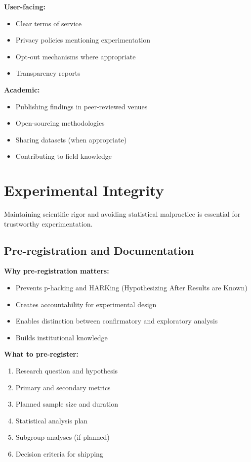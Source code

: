 \textbf{User-facing:}
\begin{itemize}
    \item Clear terms of service
    \item Privacy policies mentioning experimentation
    \item Opt-out mechanisms where appropriate
    \item Transparency reports
\end{itemize}

\textbf{Academic:}
\begin{itemize}
    \item Publishing findings in peer-reviewed venues
    \item Open-sourcing methodologies
    \item Sharing datasets (when appropriate)
    \item Contributing to field knowledge
\end{itemize}

\section{Experimental Integrity}

Maintaining scientific rigor and avoiding statistical malpractice is essential for trustworthy experimentation.

\subsection{Pre-registration and Documentation}

\textbf{Why pre-registration matters:}
\begin{itemize}
    \item Prevents p-hacking and HARKing (Hypothesizing After Results are Known)
    \item Creates accountability for experimental design
    \item Enables distinction between confirmatory and exploratory analysis
    \item Builds institutional knowledge
\end{itemize}

\textbf{What to pre-register:}
\begin{enumerate}
    \item Research question and hypothesis
    \item Primary and secondary metrics
    \item Planned sample size and duration
    \item Statistical analysis plan
    \item Subgroup analyses (if planned)
    \item Decision criteria for shipping
\end{enumerate}

